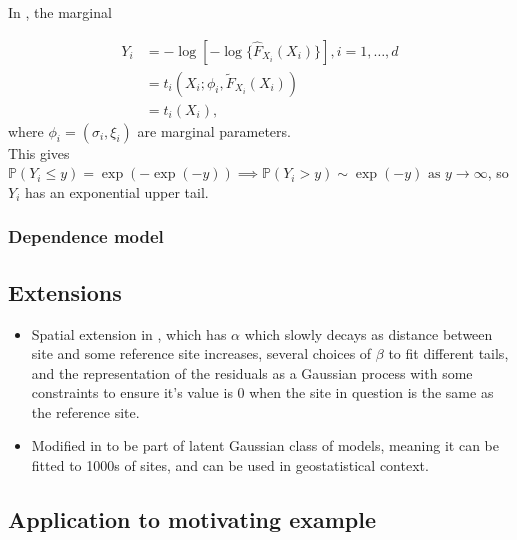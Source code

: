 \documentclass{article}
\numberwithin{equation}{section}
\begin{document}
In \cite{Heffernan2004}, the marginal

\begin{align*}
  Y_i &= -\log[-\log\{\hat{F}_{X_i}(X_i)\}], i = 1, \ldots, d \\
      &= t_i(X_i; \phi_i, \tilde{F}_{X_i}(X_i)) \\
      &= t_i(X_i),
\end{align*}
where $\phi_i = (\sigma_i, \xi_i)$ are marginal parameters. \\
This gives $\mathbb{P}(Y_i \le y) = \exp(-\exp(-y)) \implies \mathbb{P}(Y_i > y) \sim \exp(-y) \text{ as } y \rightarrow \infty$, so $Y_i$ has an exponential upper tail. 

\subsubsection{Dependence model}

\subsection{Extensions}
\begin{itemize}
  \item Spatial extension in \cite{Wadsworth2018}, which has $\alpha$ which slowly decays as distance between site and some reference site increases, several choices of $\beta$ to fit different tails, and the representation of the residuals as a Gaussian process with some constraints to ensure it's value is 0 when the site in question is the same as the reference site. 
  \item Modified in \cite{Simpson2023} to be part of latent Gaussian class of models, meaning it can be fitted to 1000s of sites, and can be used in geostatistical context.
\end{itemize}

\subsection{Application to motivating example}
\end{document}
